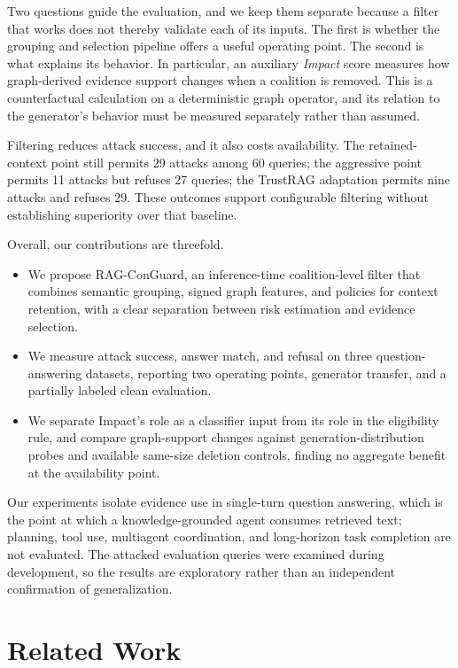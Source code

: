 \documentclass[sigconf]{aamas}
\begin{document}
Two questions guide the evaluation, and we keep them separate because a filter that works does not thereby validate each of its inputs. The first is whether the grouping and selection pipeline offers a useful operating point. The second is what explains its behavior. In particular, an auxiliary \emph{Impact} score measures how graph-derived evidence support changes when a coalition is removed. This is a counterfactual calculation on a deterministic graph operator, and its relation to the generator's behavior must be measured separately rather than assumed.

Filtering reduces attack success, and it also costs availability. The retained-context point still permits 29 attacks among 60 queries; the aggressive point permits 11 attacks but refuses 27 queries; the TrustRAG adaptation permits nine attacks and refuses 29. These outcomes support configurable filtering without establishing superiority over that baseline.

Overall, our contributions are threefold.
\begin{itemize}
\item We propose RAG-ConGuard, an inference-time coalition-level filter that combines semantic grouping, signed graph features, and policies for context retention, with a clear separation between risk estimation and evidence selection.
\item We measure attack success, answer match, and refusal on three question-answering datasets, reporting two operating points, generator transfer, and a partially labeled clean evaluation.
\item We separate Impact's role as a classifier input from its role in the eligibility rule, and compare graph-support changes against generation-distribution probes and available same-size deletion controls, finding no aggregate benefit at the availability point.
\end{itemize}
Our experiments isolate evidence use in single-turn question answering, which is the point at which a knowledge-grounded agent consumes retrieved text; planning, tool use, multiagent coordination, and long-horizon task completion are not evaluated. The attacked evaluation queries were examined during development, so the results are exploratory rather than an independent confirmation of generalization.

\section{Related Work}
\end{document}
